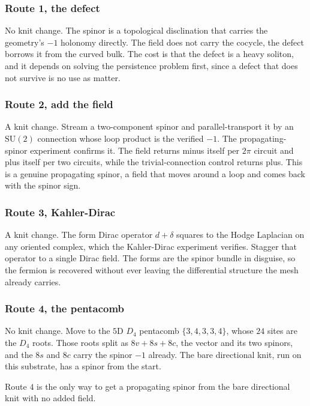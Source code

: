 \subsubsection{Route 1, the defect}

No knit change. The spinor is a topological disclination that carries the geometry's $-1$ holonomy directly. The
field does not carry the cocycle, the defect borrows it from the curved bulk. The cost is that the defect is a
heavy soliton, and it depends on solving the persistence problem first, since a defect that does not survive is
no use as matter.

\subsubsection{Route 2, add the field}

A knit change. Stream a two-component spinor and parallel-transport it by an $\mathrm{SU}(2)$ connection whose
loop product is the verified $-1$. The propagating-spinor experiment confirms it. The field returns minus itself
per $2\pi$ circuit and plus itself per two circuits, while the trivial-connection control returns plus. This is a
genuine propagating spinor, a field that moves around a loop and comes back with the spinor sign.

\subsubsection{Route 3, Kahler-Dirac}

A knit change. The form Dirac operator $d + \delta$ squares to the Hodge Laplacian on any oriented complex, which
the Kahler-Dirac experiment verifies. Stagger that operator to a single Dirac field. The forms are the spinor
bundle in disguise, so the fermion is recovered without ever leaving the differential structure the mesh already
carries.

\subsubsection{Route 4, the pentacomb}

No knit change. Move to the $5$D $D_4$ pentacomb $\{3,4,3,3,4\}$, whose $24$ sites are the $D_4$ roots. Those
roots split as $8v + 8s + 8c$, the vector and its two spinors, and the $8s$ and $8c$ carry the spinor $-1$
already. The bare directional knit, run on this substrate, has a spinor from the start.

\begin{principle}
Route $4$ is the only way to get a propagating spinor from the bare directional knit with no added field.
\end{principle}

